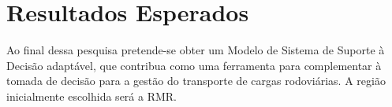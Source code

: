 \section{ Resultados Esperados}\label{resultado}

Ao final dessa pesquisa pretende-se obter um Modelo de Sistema de Suporte à Decisão adaptável, que contribua como uma ferramenta para  
complementar à tomada de decisão para a gestão do transporte de cargas rodoviárias. A região inicialmente escolhida será a RMR.








